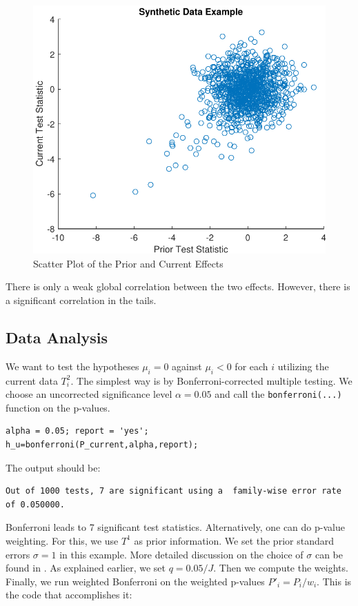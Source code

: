 \documentclass[english,11pt]{article} %
\begin{document}
\begin{figure}[ht!]
\centering
\includegraphics[scale=0.6]{"../Data/Synthetic_Data_example"}
\caption{Scatter Plot of the Prior and Current Effects}
\label{scatter_prior_current}
\end{figure}

There is only a weak global correlation between the two effects. However, there is a significant correlation in the tails. 


\subsection{Data Analysis}

We want to test the hypotheses $\mu_i = 0 $ against $\mu_i <0$ for each $i$ utilizing the current data $T^{2}_i$. The simplest way is by Bonferroni-corrected multiple testing. We choose an uncorrected significance level $\alpha=0.05$ and call the \verb+bonferroni(...)+ function on the p-values.

\begin{verbatim}
alpha = 0.05; report = 'yes';
h_u=bonferroni(P_current,alpha,report);
\end{verbatim}
The output should be:

\begin{verbatim}
Out of 1000 tests, 7 are significant using a  family-wise error rate  of 0.050000.
\end{verbatim}

Bonferroni leads to 7 significant test statistics. Alternatively, one can do p-value weighting. For this, we use $T^1$ as prior information. We set the prior standard errors $\sigma=1$ in this example. More detailed discussion on the choice of $\sigma$ can be found in \citep{dobriban2015optimal}. As explained earlier, we set $q  = 0.05/J$. Then we compute the weights. Finally, we run weighted Bonferroni on the weighted p-values $P'_i = P_i/w_i$. This is the code that accomplishes it:
\end{document}
